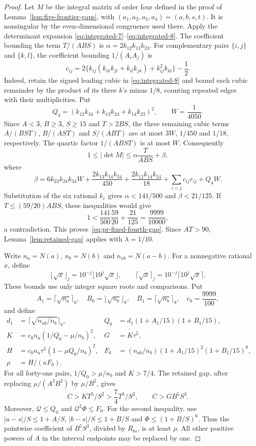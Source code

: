 \documentclass[12pt]{article}
\numberwithin{equation}{section}
\begin{document}
\begin{proof}
Let $M$ be the integral matrix of order four defined in the proof of
Lemma~\ref{lem:five-frontier-gaps}, with $(a_1,a_2,a_3,a_4)=(a,b,s,t)$.
It is nonsingular by the even-dimensional congruence used there.
Apply the determinant expansion
\eqref{eq:integrated-7}--\eqref{eq:integrated-8}. The coefficient
bounding the term $T/(ABS)$ is
$\alpha=2k_{12}k_{13}k_{23}$. For complementary pairs $\{i,j\}$
and $\{k,l\}$, the coefficient bounding $1/(A_iA_j)$ is
\begin{equation*}
 c_{ij}=2\{k_{ij}(k_{ik}k_{jl}+k_{il}k_{jk})
                  +k_{ij}^2k_{kl}\}-\frac12.
\end{equation*}
Indeed, retain the signed leading cubic in
\eqref{eq:integrated-8} and bound each cubic remainder by the
product of its three $k$'s minus $1/8$, counting repeated edges
with their multiplicities. Put
\[
 Q_4=(k_{12}k_{34}+k_{13}k_{24}+k_{14}k_{23})^2,\qquad
 W=\frac1{4050}.
\]
Since $A<3$, $B\ge3$, $S\ge15$ and $T>2BS$, the three remaining
cubic terms $A/(BST)$, $B/(AST)$ and $S/(ABT)$ are at most
$3W$, $1/450$ and $1/18$, respectively. The quartic factor
$1/(ABST)$ is at most $W$. Consequently
\[
 1\le|\det M|\le\alpha\frac{T}{ABS}+\beta,
\]
where
\[
 \beta=6k_{23}k_{24}k_{34}W
       +\frac{2k_{13}k_{14}k_{34}}{450}
       +\frac{2k_{12}k_{14}k_{24}}{18}
       +\sum_{i<j}c_{ij}r_{ij}+Q_4W.
\]
Substitution of the six rational $k_e$ gives
$\alpha<141/500$ and $\beta<21/125$. If $T\le(59/20)ABS$,
these inequalities would give
\[
 1<\frac{141}{500}\frac{59}{20}+\frac{21}{125}
   =\frac{9999}{10000},
\]
a contradiction. This proves~\eqref{eq:pr-fixed-fourth-gap}.
Since $AT>90$, Lemma~\ref{lem:retained-gap} applies with
$\lambda=1/10$.

Write $n_a=N(a)$, $n_b=N(b)$ and $n_{ab}=N(a-b)$. For a nonnegative
rational $x$, define
\[
 \lfloor\sqrt{x}\rfloor_j=10^{-j}\lfloor10^j\sqrt{x}\rfloor,
 \qquad
 \lceil\sqrt{x}\rceil_j=10^{-j}\lceil10^j\sqrt{x}\rceil.
\]
These bounds use only integer square roots and comparisons. Put
\[
 A_1=\lceil\sqrt{n_a}\rceil_8,\quad
 B_0=\lfloor\sqrt{n_b}\rfloor_8,\quad
 B_1=\lceil\sqrt{n_b}\rceil_8,\quad c_0=\frac{9999}{100},
\]
and define
\begin{align*}
 d_1&=\lceil\sqrt{n_{ab}/n_b}\rceil_8,&
 Q_0&=d_1(1+A_1/15)(1+B_1/15),\\
 K&=c_0n_a(1/Q_0-\mu/n_b)^2,&G&=K\tau^5,\\
 H&=c_0n_a\tau^5(1-\mu Q_0/n_b)^2,&
 F_0&=(n_{ab}/n_b)(1+A_1/15)^2(1+B_1/15)^8,\\
 \rho&=H/(\kappa F_0).&&
\end{align*}
For all forty-one pairs, $1/Q_0>\mu/n_b$ and $K>7/4$.
The retained gap, after replacing $\mu/(A^2B^2)$ by $\mu/B^2$, gives
\[
 C>K T^5/S^2>\frac74T^5/S^2,\qquad C>GB^5S^3.
\]
Moreover, $\mathcal Q\le Q_0$ and $\mathcal Q^2\Phi\le F_0$.
For the second inequality, use $|a-s|/S\le1+A/S$,
$|b-s|/S\le1+B/S$ and $\Phi\le(1+B/S)^6$.
Thus the pointwise coefficient of $B^5S^3$, divided by $R_{bs}$,
is at least $\rho$. All other positive powers of $A$ in the
interval endpoints may be replaced by one.


\end{proof}
\end{document}
